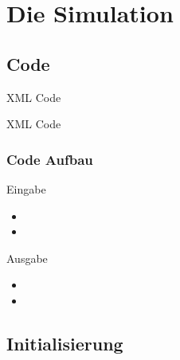\documentclass[11pt]{beamer}
\begin{document}
\section{Die Simulation}

\subsection{Code}

  \vspace*{-0.3cm}
  \begin{center}
   XML Code
  \end{center}


  \vspace*{-0.3cm}
  \begin{center}
   XML Code
  \end{center}


\begin{frame}
\frametitle{Code Aufbau}
  \vspace*{-0.3cm}
  \begin{block}{Eingabe}
  \begin{itemize}
      \item 
      \item 
    \end{itemize}
  \end{block}
  \pause
    \begin{block}{Ausgabe}
  \begin{itemize}
      \item 
      \item 
    \end{itemize}
  \end{block}
\end{frame}

\subsection{Initialisierung}
\end{document}
